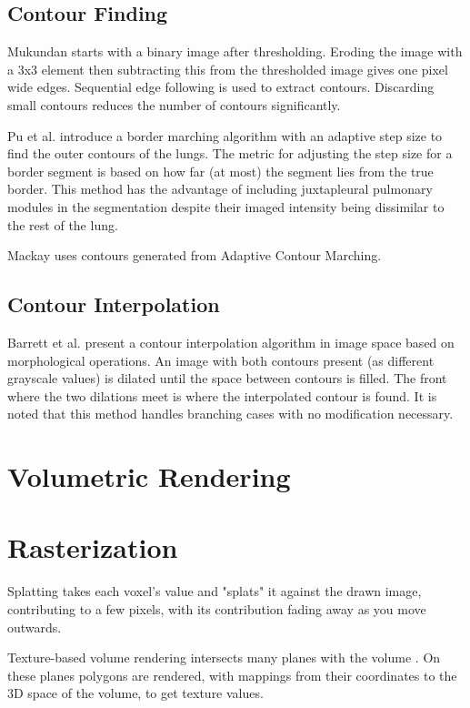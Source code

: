 \documentclass[acmsmall, 12pt]{acmart}
\begin{document}
\subsection{Contour Finding}

Mukundan \cite{mukundan2016reconstruction} starts with a binary image after thresholding. Eroding the image with a 3x3 element then subtracting this from the thresholded image gives one pixel wide edges. Sequential edge following is used to extract contours. Discarding small contours reduces the number of contours significantly.

Pu et al. \cite{pu2008adaptive} introduce a border marching algorithm with an adaptive step size to find the outer contours of the lungs. The metric for adjusting the step size for a border segment is based on how far (at most) the segment lies from the true border. This method has the advantage of including juxtapleural pulmonary modules in the segmentation despite their imaged intensity being dissimilar to the rest of the lung.

Mackay \cite{mackay2019robust} uses contours generated from Adaptive Contour Marching.

\subsection{Contour Interpolation}

Barrett et al. \cite{barrett1994image} present a contour interpolation algorithm in image space based on morphological operations. An image with both contours present (as different grayscale values) is dilated until the space between contours is filled. The front where the two dilations meet is where the interpolated contour is found. It is noted that this method handles branching cases with no modification necessary.

\section{Volumetric Rendering}

\section{Rasterization}

Splatting takes each voxel's value and "splats" it against the drawn image, contributing to a few pixels, with its contribution fading away as you move outwards.

Texture-based volume rendering intersects many planes with the volume \cite{ohiotexture}. On these planes polygons are rendered, with mappings from their coordinates to the 3D space of the volume, to get texture values. 
\end{document}
